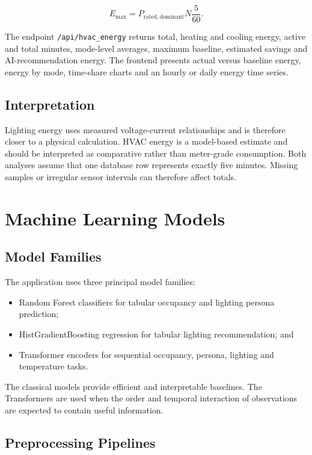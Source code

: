 \[
    E_{\mathrm{max}} =
    P_{\mathrm{rated,dominant}}N\frac{5}{60}.
\]

The endpoint \texttt{/api/hvac\_energy} returns total, heating and cooling
energy, active and total minutes, mode-level averages, maximum baseline,
estimated savings and AI-recommendation energy. The frontend presents actual
versus baseline energy, energy by mode, time-share charts and an hourly or
daily energy time series.

\section{Interpretation}

Lighting energy uses measured voltage-current relationships and is therefore
closer to a physical calculation. HVAC energy is a model-based estimate and
should be interpreted as comparative rather than meter-grade consumption.
Both analyses assume that one database row represents exactly five minutes.
Missing samples or irregular sensor intervals can therefore affect totals.


\chapter{Machine Learning Models}
\label{chap:machine-learning-models}

\section{Model Families}

The application uses three principal model families:

\begin{itemize}
    \item Random Forest classifiers for tabular occupancy and lighting persona
    prediction;
    \item HistGradientBoosting regression for tabular lighting recommendation;
    and
    \item Transformer encoders for sequential occupancy, persona, lighting and
    temperature tasks.
\end{itemize}

The classical models provide efficient and interpretable baselines. The
Transformers are used when the order and temporal interaction of observations
are expected to contain useful information.

\section{Preprocessing Pipelines}

